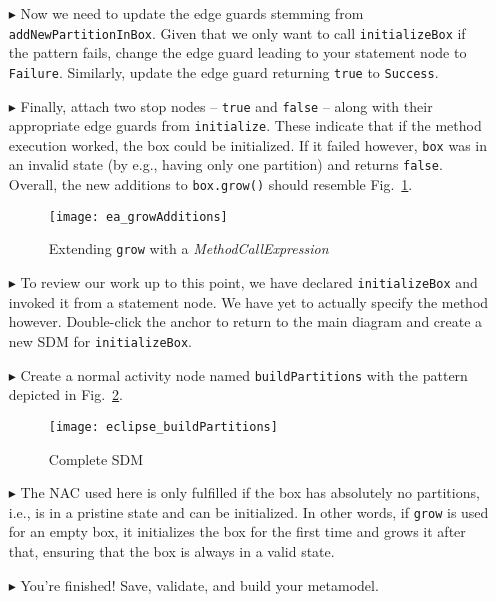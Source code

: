 \begin{itemize}
\clearpage

\item[$\blacktriangleright$] Now we need to update the edge guards stemming from \texttt{add\-New\-Part\-ition\-In\-Box}. Given that we only want to call
\texttt{initializeBox} if the pattern fails, change the edge guard leading to your statement node to \texttt{Failure}. Similarly, update the edge guard
returning \texttt{true} to \texttt{Success}.

\item[$\blacktriangleright$] Finally, attach two stop nodes -- \texttt{true} and \texttt{false} -- along with their appropriate edge guards from
\texttt{initialize}. These indicate that if the method execution worked, the box could be initialized. If it failed however, \texttt{box} was
in an invalid state (by e.g., having only one partition) and returns \texttt{false}. Overall, the new additions to \texttt{box.grow()} should resemble
Fig.~\ref{ea:newGrowControl}.

\vspace{0.5cm}

\begin{figure}[htp]
\begin{center}
  \texttt{[image: ea\_growAdditions]}
  \caption{Extending \texttt{grow} with a \emph{MethodCallExpression}}
  \label{ea:newGrowControl}
\end{center}
\end{figure}

\item[$\blacktriangleright$] To review our work up to this point, we have declared \texttt{initializeBox} and invoked it from a statement node. We have yet
to actually specify the method however. Double-click the anchor to return to the main diagram and create a new SDM
for \texttt{initializeBox}.

\item[$\blacktriangleright$] Create a normal activity node named \texttt{buildPartitions} with the pattern depicted in Fig.~\ref{ea:buildPartitions}.

\newpage
 
\begin{figure}[htp]
\begin{center}
  \texttt{[image: eclipse\_buildPartitions]}
  \caption{Complete SDM}
  \label{ea:buildPartitions}
\end{center}
\end{figure}
 
\item[$\blacktriangleright$] The NAC used here is only fulfilled if the box has absolutely no partitions, i.e., is in a pristine state and can be
initialized. In other words, if \texttt{grow} is used for an empty box, it initializes the box for the first time and grows it after that, ensuring that the box
is always in a valid state.
 
\item[$\blacktriangleright$] You're finished! Save, validate, and build your metamodel.

\end{itemize}
